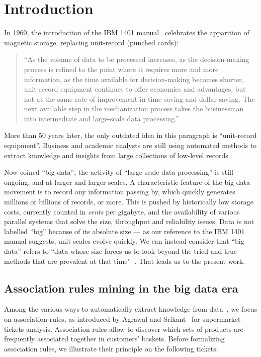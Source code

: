 \chapter{Introduction}
\label{chap:intro}

In 1960, the introduction of the IBM 1401 manual~\cite{IBM60} celebrates
the apparition of magnetic storage, replacing unit-record (punched cards):

\begin{quote}
  ``As the volume of data to be processed increases, as the decision-making process is refined to the point where it requires more and more information, as the time available for decision-making becomes shorter, unit-record equipment continues to offer economies and advantages, but not at the same rate of improvement in time-saving and dollar-saving.
The next available step in the mechanization process takes the businessman into intermediate and large-scale data processing.''
\end{quote}

More than 50 years later,
the only outdated idea in this paragraph is ``unit-record equipment''.
Business and academic analysts are still using automated methods
to extract knowledge and insights from large collections of low-level records.

Now coined ``big data'',
the activity of ``large-scale data processing'' is still ongoing,
and at larger and larger scales.
A characteristic feature of the big data movement is to record any information passing by,
which quickly generates millions or billions of records, or more.
This is pushed by historically low storage costs, currently counted in {\em cents} per gigabyte,
and the availability of various parallel systems that solve the size, throughput and reliability issues.
Data is not labelled ``big'' because of its absolute size ---
as our reference to the IBM 1401 manual suggests, unit scales evolve quickly.
We can instead consider that ``big data'' refers to
``data whose size forces us to look beyond the tried-and-true methods that are prevalent at that time''~\cite{JacobsACM09}.
That leads us to the present work.


\vfill
\pagebreak

\section{Association rules mining in the big data era} %
\label{sec:intro:context}

Among the various ways to automatically extract knowledge from data~\cite{Tan2007},
we focus on association rules,
as introduced by Agrawal and Srikant~\cite{AgrawalVLDB94} for supermarket tickets analysis.
Association rules allow to discover which sets of products are frequently associated together in customers' baskets.
Before formalizing association rules,
we illustrate their principle on the following tickets:

